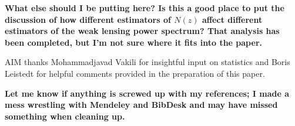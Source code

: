 \documentclass[preprint]{aastex}
\begin{document}
\textbf{What else should I be putting here?  Is this a good place to put the 
discussion of how different estimators of $N(z)$ affect different estimators of 
the weak lensing power spectrum?  That analysis has been completed, but I'm not 
sure where it fits into the paper.}


\begin{acknowledgements}
AIM thanks Mohammadjavad Vakili for insightful input on statistics and Boris 
Leistedt for helpful comments provided in the preparation of this paper.
\end{acknowledgements}

\textbf{Let me know if anything is screwed up with my references; I made a mess 
wrestling with Mendeley and BibDesk and may have missed something when cleaning 
up.}


\end{document}
